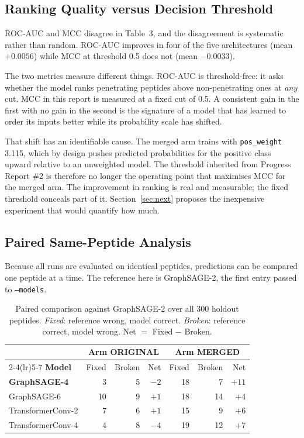 \documentclass[11pt,a4paper]{article}
\newcommand{\up}[1]{\textcolor{tealx}{#1}}
\newcommand{\dn}[1]{\textcolor{downr}{#1}}
\newcommand{\code}[1]{\texttt{\small #1}}
\begin{document}
\subsection{Ranking Quality versus Decision Threshold}
ROC-AUC and MCC disagree in Table~3, and the disagreement is systematic rather than random. ROC-AUC
improves in four of the five architectures (mean $+0.0056$) while MCC at threshold 0.5 does not (mean
$-0.0033$).

The two metrics measure different things. ROC-AUC is threshold-free: it asks whether the model ranks
penetrating peptides above non-penetrating ones at \emph{any} cut. MCC in this report is measured at a
fixed cut of 0.5. A consistent gain in the first with no gain in the second is the signature of a model
that has learned to order its inputs better while its probability scale has shifted.

That shift has an identifiable cause. The merged arm trains with \code{pos\_weight} 3.115, which by design
pushes predicted probabilities for the positive class upward relative to an unweighted model. The
threshold inherited from Progress Report \#2 is therefore no longer the operating point that maximises
MCC for the merged arm. The improvement in ranking is real and measurable; the fixed threshold conceals
part of it. Section~\ref{sec:next} proposes the inexpensive experiment that would quantify how much.

\subsection{Paired Same-Peptide Analysis}
\label{sec:paired}
Because all runs are evaluated on identical peptides, predictions can be compared one peptide at a time.
The reference here is GraphSAGE-2, the first entry passed to \code{--models}.

\begin{table}[h]
\centering\small
\begin{tabular}{@{}lrrrrrr@{}}
\toprule
& \multicolumn{3}{c}{\sffamily\bfseries\color{navy}Arm ORIGINAL} & \multicolumn{3}{c}{\sffamily\bfseries\color{navy}Arm MERGED}\\
\cmidrule(lr){2-4}\cmidrule(lr){5-7}
\sffamily\bfseries\color{navy}Model & Fixed & Broken & Net & Fixed & Broken & Net\\
\midrule
\textbf{GraphSAGE-4} &  3 &  5 & \dn{$-2$} & 18 &  7 & \up{$+11$}\\
GraphSAGE-6          & 10 &  9 & \up{$+1$} & 18 & 14 & \up{$+4$}\\
TransformerConv-2    &  7 &  6 & \up{$+1$} & 15 &  9 & \up{$+6$}\\
TransformerConv-4    &  4 &  8 & \dn{$-4$} & 19 & 12 & \up{$+7$}\\
\bottomrule
\end{tabular}
\caption{Paired comparison against GraphSAGE-2 over all 300 holdout peptides. \emph{Fixed}: reference
wrong, model correct. \emph{Broken}: reference correct, model wrong. Net $=$ Fixed $-$ Broken.}
\end{table}
\end{document}
